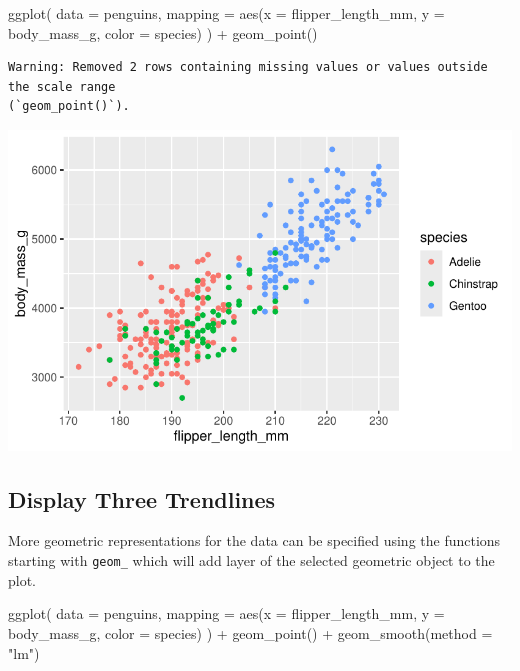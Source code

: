 \documentclass[
  letterpaper,
  DIV=11,
  numbers=noendperiod]{scrreprt}
\newenvironment{Shaded}{\begin{snugshade}}{\end{snugshade}}
\newcommand{\AttributeTok}[1]{\textcolor[rgb]{0.40,0.45,0.13}{#1}}
\newcommand{\FunctionTok}[1]{\textcolor[rgb]{0.28,0.35,0.67}{#1}}
\newcommand{\NormalTok}[1]{\textcolor[rgb]{0.00,0.23,0.31}{#1}}
\newcommand{\SpecialCharTok}[1]{\textcolor[rgb]{0.37,0.37,0.37}{#1}}
\newcommand{\StringTok}[1]{\textcolor[rgb]{0.13,0.47,0.30}{#1}}
\begin{document}
\begin{Shaded}
\begin{Highlighting}[]
\FunctionTok{ggplot}\NormalTok{(}
  \AttributeTok{data =}\NormalTok{ penguins,}
  \AttributeTok{mapping =} \FunctionTok{aes}\NormalTok{(}\AttributeTok{x =}\NormalTok{ flipper\_length\_mm, }\AttributeTok{y =}\NormalTok{ body\_mass\_g, }\AttributeTok{color =}\NormalTok{ species)}
\NormalTok{) }\SpecialCharTok{+}
  \FunctionTok{geom\_point}\NormalTok{()}
\end{Highlighting}
\end{Shaded}

\begin{verbatim}
Warning: Removed 2 rows containing missing values or values outside the scale range
(`geom_point()`).
\end{verbatim}

\includegraphics{src/r-for-data-science/01-data-viz_files/figure-pdf/unnamed-chunk-11-1.pdf}

\subsection{Display Three Trendlines}\label{display-three-trendlines}

More geometric representations for the data can be specified using the
functions starting with \texttt{geom\_} which will add layer of the
selected geometric object to the plot.

\begin{Shaded}
\begin{Highlighting}[]
\FunctionTok{ggplot}\NormalTok{(}
  \AttributeTok{data =}\NormalTok{ penguins,}
  \AttributeTok{mapping =} \FunctionTok{aes}\NormalTok{(}\AttributeTok{x =}\NormalTok{ flipper\_length\_mm, }\AttributeTok{y =}\NormalTok{ body\_mass\_g, }\AttributeTok{color =}\NormalTok{ species)}
\NormalTok{) }\SpecialCharTok{+}
  \FunctionTok{geom\_point}\NormalTok{() }\SpecialCharTok{+}
  \FunctionTok{geom\_smooth}\NormalTok{(}\AttributeTok{method =} \StringTok{"lm"}\NormalTok{)}
\end{Highlighting}
\end{Shaded}
\end{document}
